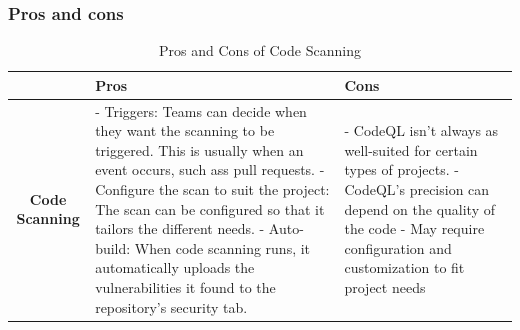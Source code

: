 \subsubsection{Pros and cons}
\begin{table}[H]
\centering
\begin{tabular}{|c|p{6cm}|p{6cm}|}
\hline
 & \textbf{Pros} & \textbf{Cons} \\
\hline
\textbf{Code Scanning} & 
- Triggers: Teams can decide when they want the scanning to be triggered. This is usually when an event occurs, such ass pull requests.  \newline
- Configure the scan to suit the project: The scan can be configured so that it tailors the 
  different needs. \newline
- Auto-build: When code scanning runs, it automatically uploads the vulnerabilities it found to the repository's security tab. &
- CodeQL isn't always as well-suited for certain types of projects. \newline
- CodeQL's precision can depend on the quality of the code\newline
- May require configuration and customization to fit project needs \\
\hline
\end{tabular}
\caption{Pros and Cons of Code Scanning}
\label{tab: Code Scanning}
\end{table}


